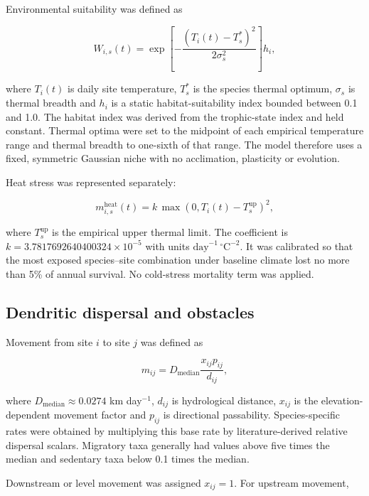 \documentclass[11pt,a4paper]{article}
\begin{document}
Environmental suitability was defined as

\begin{equation}
W_{i,s}(t) = \exp\left[-\frac{(T_i(t)-T_s^*)^2}{2\sigma_s^2}\right]h_i,
\end{equation}

where $T_i(t)$ is daily site temperature, $T_s^*$ is the species thermal optimum, $\sigma_s$ is thermal breadth and $h_i$ is a static habitat-suitability index bounded between 0.1 and 1.0. The habitat index was derived from the trophic-state index and held constant. Thermal optima were set to the midpoint of each empirical temperature range and thermal breadth to one-sixth of that range. The model therefore uses a fixed, symmetric Gaussian niche with no acclimation, plasticity or evolution.

Heat stress was represented separately:

\begin{equation}
m^{\mathrm{heat}}_{i,s}(t) = k\,\max\left(0,T_i(t)-T^{\mathrm{up}}_s\right)^2,
\end{equation}

where $T^{\mathrm{up}}_s$ is the empirical upper thermal limit. The coefficient is
$k=3.7817692640400324\times10^{-5}$ with units
$\mathrm{day}^{-1}\,{}^\circ\mathrm{C}^{-2}$. It was calibrated so that the most exposed species--site combination under baseline climate lost no more than 5\% of annual survival. No cold-stress mortality term was applied.

\subsection{Dendritic dispersal and obstacles}

Movement from site $i$ to site $j$ was defined as

\begin{equation}
m_{ij}=D_{\mathrm{median}}\frac{x_{ij}p_{ij}}{d_{ij}},
\end{equation}

where $D_{\mathrm{median}}\approx0.0274$ km day$^{-1}$, $d_{ij}$ is hydrological distance, $x_{ij}$ is the elevation-dependent movement factor and $p_{ij}$ is directional passability. Species-specific rates were obtained by multiplying this base rate by literature-derived relative dispersal scalars. Migratory taxa generally had values above five times the median and sedentary taxa below 0.1 times the median.

Downstream or level movement was assigned $x_{ij}=1$. For upstream movement,
\end{document}
